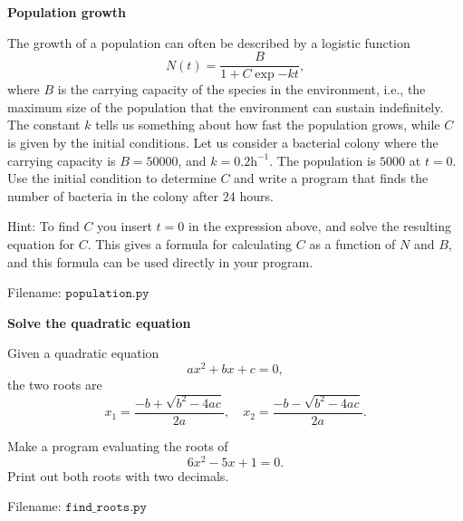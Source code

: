 \begin{Problem}{\textbf{Population growth}}\label{prob13}

\noindent The growth of a population can often be described by a logistic function
\begin{equation*}
N(t) = \frac{B}{1 + C \exp{-kt}},
\end{equation*}
where $B$ is the carrying capacity of the species in the environment, i.e., the
maximum size of the population that the environment can sustain indefinitely.
The constant $k$ tells us something about how fast the population grows, while $C$ is given
by the initial conditions. Let us consider a bacterial colony where the carrying
capacity is $B = 50 000$, and $k = 0.2\mathrm{h^{-1}}$. The population is
$5000$ at $t = 0$. Use the initial condition to determine $C$
and write a program that finds the number of bacteria in the colony after $24$ hours.

Hint: To find $C$ you insert $t=0$ in the expression above, and solve the resulting
equation for $C$. This gives a formula for calculating $C$ as a function of $N$ and
$B$, and this formula can be used directly in your program.

Filename: $\texttt{population.py}$
\end{Problem}

\begin{Problem}{\textbf{Solve the quadratic equation}}\label{prob13}

\noindent Given a quadratic equation
\begin{equation*}
ax^2 +bx + c = 0,
\end{equation*}
the two roots are
\begin{equation*}
x_1 = \frac{-b + \sqrt{b^2 - 4ac}}{2a}, \quad x_2 = \frac{-b - \sqrt{b^2 - 4ac}}{2a}.
\end{equation*}

Make a program evaluating the roots of
\begin{equation*}
6x^2 - 5x + 1 = 0.
\end{equation*}
Print out both roots with two decimals.

Filename: $\texttt{find\_roots.py}$
\end{Problem}

